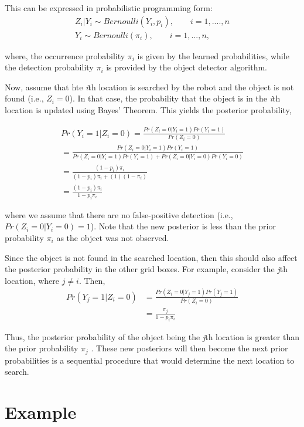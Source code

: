 This can be expressed in probabilistic programming form:
\begin{gather}
	Z_i | Y_i \sim Bernoulli (Y_i, p_i), \qquad  i  = 1,....,n \\
	Y_i \sim Bernoulli(\pi_i),\qquad   i = 1,...,n,
\end{gather}

where, the occurrence probability {$\pi_i$} is given by the learned probabilities, while the detection probability {$\pi_i$} is provided by the object detector algorithm.

Now, assume that hte \emph{i}th location is searched by the robot and the object is not found (i.e., $Z_i = 0$). In that case, the probability that the object is in the \emph{i}th location is updated using Bayes' Theorem. This yields the posterior probability,

\begin{gather*}
	Pr(Y_i = 1 | Z_i = 0) = \frac{Pr(Z_i = 0|Y_i=1)Pr(Y_i=1)} {Pr(Z_i=0)} \\
	                       = \frac{Pr(Z_i = 0| Y_i =1 )Pr(Y_i =1)}{Pr(Z_i=0|Y_i =1)Pr(Y_i = 1) + Pr(Z_i=0|Y_i=0)Pr(Y_i=0)} \\
	                       = \frac{(1 - p_i)\pi_i}{(1 - p_i)\pi_i + (1)(1 - \pi_i)} \\
	                       = \frac{(1 - p_i)\pi_i}{1 - p_i\pi_i}
\end{gather*}

where we assume that there are no false-positive detection (i.e., $Pr(Z_i =0| Y_i = 0) = 1$). Note that the new posterior is less than the prior probability $\pi_i$ as the object was not observed.

Since the object is not found in the searched location, then this should also affect the posterior probability in the other grid boxes. For example, consider the \emph{j}th location, where $j \neq i$. Then,
\begin{align*}
	Pr(Y_j = 1 | Z_i=0) &= \frac{Pr(Z_i = 0 | Y_j = 1)Pr(Y_j = 1)}{Pr(Z_i = 0)} \\
	                    &= \frac{\pi_j}{ 1 - p_i\pi_i}
\end{align*}

Thus, the posterior probability of the object being the \emph{j}th location is greater than the prior probability $\pi_j$ . These new posteriors will then become the next prior probabilities is a sequential procedure that would determine the next location to search.


\section{Example}

